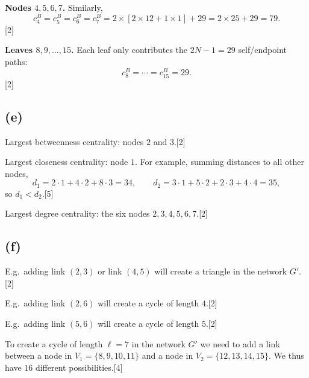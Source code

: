 \documentclass[11pt,a4paper]{article}
\newcommand{\mk}[1]{\hfill{\small[#1]}}
\begin{document}
\noindent\textbf{Nodes $4,5,6,7$.}
Similarly,
\[
  c_4^{B} = c_5^{B} = c_6^{B} = c_7^{B} = 2 \times [2 \times 12 + 1 \times 1] + 29 = 2 \times 25 + 29 = 79.
\]
\noindent\mbox{}\hfill{\small[2]}

\noindent\textbf{Leaves $8,9,\ldots,15$.}
Each leaf only contributes the $2N - 1 = 29$ self/endpoint paths:
\[
  c_8^{B} = \cdots = c_{15}^{B} = 29.
\]
\noindent\mbox{}\hfill{\small[2]}

\subsection*{(e)}

\noindent Largest betweenness centrality: nodes $2$ and $3$.\mk{2}

\noindent Largest closeness centrality: node $1$. For example, summing distances to all other nodes,
\[
  d_1 = 2 \cdot 1 + 4 \cdot 2 + 8 \cdot 3 = 34,
  \qquad
  d_2 = 3 \cdot 1 + 5 \cdot 2 + 2 \cdot 3 + 4 \cdot 4 = 35,
\]
so $d_1 < d_2$.\mk{5}

\noindent Largest degree centrality: the six nodes $2, 3, 4, 5, 6, 7$.\mk{2}

\subsection*{(f)}

\noindent E.g.\ adding link $(2,3)$ or link $(4,5)$ will create a triangle in the network $G'$.\mk{2}

\noindent E.g.\ adding link $(2,6)$ will create a cycle of length $4$.\mk{2}

\noindent E.g.\ adding link $(5,6)$ will create a cycle of length $5$.\mk{2}

\noindent To create a cycle of length $\ell = 7$ in the network $G'$ we need to add a link between a node in $V_1 = \{8, 9, 10, 11\}$ and a node in $V_2 = \{12, 13, 14, 15\}$. We thus have $16$ different possibilities.\mk{4}
\end{document}
